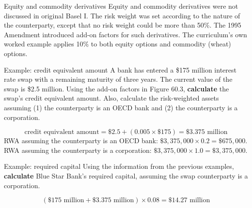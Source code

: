 \begin{ornotebox}{Equity and commodity derivatives}
Equity and commodity derivatives were not discussed in original Basel I. The risk
weight was set according to the nature of the counterparty, except that no risk
weight could be more than 50\%. The 1995 Amendment introduced add-on factors for
such derivatives. The curriculum's own worked example applies 10\% to both equity
options and commodity (wheat) options.
\end{ornotebox}

\begin{orexambox}{Example: credit equivalent amount}
A bank has entered a \$175 million interest rate swap with a remaining maturity of
three years. The current value of the swap is \$2.5 million. Using the add-on
factors in Figure 60.3, \textbf{calculate} the swap's credit equivalent amount.
Also, calculate the risk-weighted assets assuming (1) the counterparty is an OECD
bank and (2) the counterparty is a corporation.

\vspace{6pt}
\par
\[
\text{credit equivalent amount}=\$2.5+(0.005\times\$175)=\$3.375\text{ million}
\]
RWA assuming the counterparty is an OECD bank:
$\$3{,}375{,}000\times0.2=\$675{,}000$.\\
RWA assuming the counterparty is a corporation:
$\$3{,}375{,}000\times1.0=\$3{,}375{,}000$.
\end{orexambox}

\begin{orexambox}{Example: required capital}
Using the information from the previous examples, \textbf{calculate} Blue Star
Bank's required capital, assuming the swap counterparty is a corporation.

\vspace{6pt}
\par
\[
(\$175\text{ million}+\$3.375\text{ million})\times0.08=\$14.27\text{ million}
\]
\end{orexambox}


